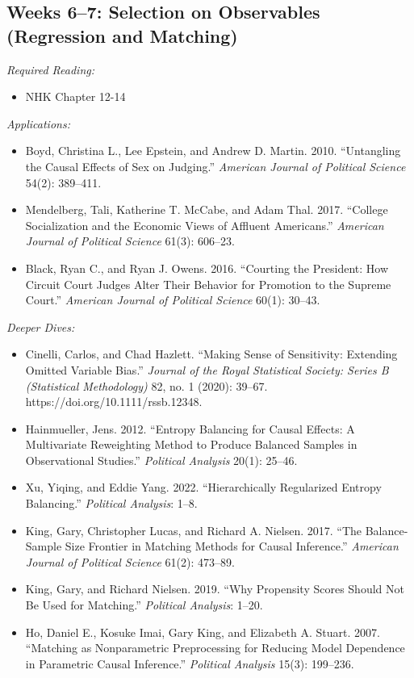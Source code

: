 \documentclass[11pt, letterpaper]{article}
\begin{document}
\subsection*{Weeks 6--7: Selection on Observables (Regression and Matching)}

\textit{Required Reading:}

\begin{itemize}
	\item NHK Chapter 12-14
\end{itemize}

\noindent \textit{Applications:}

\begin{itemize}
	\item Boyd, Christina L., Lee Epstein, and Andrew D. Martin. 2010. ``Untangling the Causal Effects of Sex on Judging.'' \textit{American Journal of Political Science} 54(2): 389–411.
	\item Mendelberg, Tali, Katherine T. McCabe, and Adam Thal. 2017. ``College Socialization and the Economic Views of Affluent Americans.'' \textit{American Journal of Political Science} 61(3): 606–23.
	\item Black, Ryan C., and Ryan J. Owens. 2016. “Courting the President: How Circuit Court Judges Alter Their Behavior for Promotion to the Supreme Court.” \textit{American Journal of Political Science} 60(1): 30–43.
\end{itemize}


\noindent \textit{Deeper Dives:}

\begin{itemize}
	\item Cinelli, Carlos, and Chad Hazlett. ``Making Sense of Sensitivity: Extending Omitted Variable Bias.'' \textit{Journal of the Royal Statistical Society: Series B (Statistical Methodology)} 82, no. 1 (2020): 39–67. https://doi.org/10.1111/rssb.12348.
	\item Hainmueller, Jens. 2012. ``Entropy Balancing for Causal Effects: A Multivariate Reweighting Method to Produce Balanced Samples in Observational Studies.'' \textit{Political Analysis} 20(1): 25–46.
	\item Xu, Yiqing, and Eddie Yang. 2022. ``Hierarchically Regularized Entropy Balancing.'' \textit{Political Analysis}: 1–8.
	\item King, Gary, Christopher Lucas, and Richard A. Nielsen. 2017. ``The Balance-Sample Size Frontier in Matching Methods for Causal Inference.'' \textit{American Journal of Political Science} 61(2): 473–89.
	\item King, Gary, and Richard Nielsen. 2019. ``Why Propensity Scores Should Not Be Used for Matching.'' \textit{Political Analysis}: 1–20.
	\item Ho, Daniel E., Kosuke Imai, Gary King, and Elizabeth A. Stuart. 2007. “Matching as Nonparametric Preprocessing for Reducing Model Dependence in Parametric Causal Inference.” \textit{Political Analysis} 15(3): 199–236.
\end{itemize}
\end{document}
